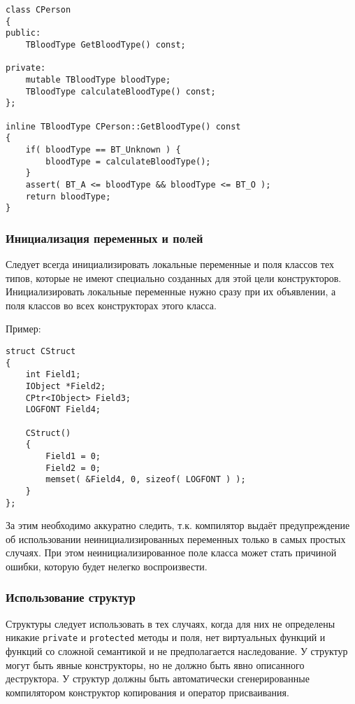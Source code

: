 {{{\begin{lstlisting}[frame=single]
class CPerson
{
public:
    TBloodType GetBloodType() const;
	
private:
    mutable TBloodType bloodType;
    TBloodType calculateBloodType() const;
};

inline TBloodType CPerson::GetBloodType() const
{
    if( bloodType == BT_Unknown ) {
        bloodType = calculateBloodType();
    }
    assert( BT_A <= bloodType && bloodType <= BT_O );
    return bloodType;
}
\end{lstlisting}

\subsubsection{Инициализация переменных и полей}

Следует всегда инициализировать локальные переменные и поля классов тех типов, которые не имеют специально созданных для этой цели конструкторов. Инициализировать локальные переменные нужно сразу при их объявлении, а поля классов во всех конструкторах этого класса.

\newpage
Пример:

\begin{lstlisting}[frame=single]
struct CStruct
{
    int Field1;
    IObject *Field2;
    CPtr<IObject> Field3;
    LOGFONT Field4;

    CStruct()
    {
        Field1 = 0;
        Field2 = 0;
        memset( &Field4, 0, sizeof( LOGFONT ) );
    }
};
\end{lstlisting}

За этим необходимо аккуратно следить, т.к. компилятор выдаёт предупреждение об использовании неинициализированных переменных только в самых простых случаях. При этом неинициализированное поле класса может стать причиной ошибки, которую будет нелегко воспроизвести.

\subsubsection{Использование структур}

Структуры следует использовать в тех случаях, когда для них не определены никакие \lstinline|private| и \lstinline|protected| методы и поля, нет виртуальных функций и функций со сложной семантикой и не предполагается наследование. У структур могут быть явные конструкторы, но не должно быть явно описанного деструктора. У структур должны быть автоматически сгенерированные компилятором конструктор копирования и оператор присваивания. 

}}}
